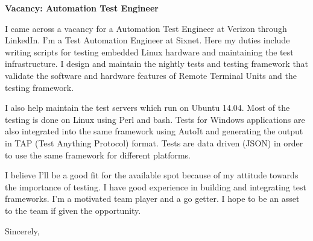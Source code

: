 \documentclass[12pt]{extletter}
\newcommand{\jobPosition}{Automation Test Engineer}
\newcommand{\companyName}{Verizon}
\begin{document}
\begin{letter}{}

\opening{\textbf{Vacancy: {\jobPosition}}}

I came across a vacancy for a {\jobPosition} at {\companyName} through
LinkedIn. I'm a Test Automation Engineer at Sixnet. Here my duties include
writing scripts for testing embedded Linux hardware and maintaining the test
infrastructure. I design and maintain the nightly tests and testing framework
that validate the software and hardware features of Remote Terminal Units and
the testing framework.

I also help maintain the test servers which run on Ubuntu 14.04. Most of the
testing is done on Linux using Perl and bash. Tests for Windows applications
are also integrated into the same framework using AutoIt and generating the
output in TAP (Test Anything Protocol) format. Tests are data driven (JSON)
in order to use the same framework for different platforms.

I believe I'll be a good fit for the available spot because of my attitude
towards the importance of testing. I have good experience in building and
integrating test frameworks. I'm a motivated team player and a go getter. I
hope to be an asset to the team if given the opportunity.

\vspace{2\parskip} %
\closing{Sincerely,}
\vspace{2\parskip} %

\end{letter}
 
\end{document}
